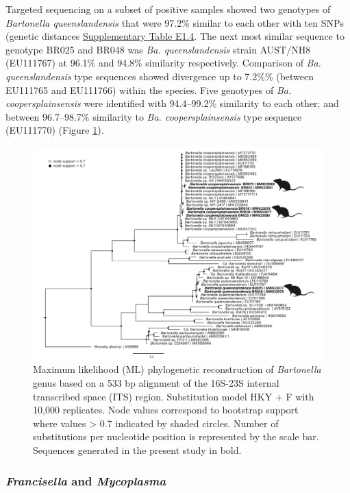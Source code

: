\documentclass[a4paper, nobind]{templates/ociamthesis}
\begin{document}
Targeted sequencing on a subset of positive samples showed two genotypes of \emph{Bartonella queenslandensis} that were 97.2\% similar to each other with ten SNPs (genetic distances \protect\hyperlink{supplementary-table-e1.4}{Supplementary Table E1.4}.
The next most similar sequence to genotype BR025 and BR048 was \emph{Ba. queenslandensis} strain AUST/NH8 (EU111767) at 96.1\% and 94.8\% similarity respectively.
Comparison of \emph{Ba. queenslandensis} type sequences showed divergence up to 7.2\%\% (between EU111765 and EU111766) within the species. Five genotypes of \emph{Ba. coopersplainsensis} were identified with 94.4--99.2\% similarity to each other; and between 96.7--98.7\% similarity to \emph{Ba. coopersplainsensis} type sequence (EU111770) (Figure \ref{fig:F3bartonella}).

\begin{figure}
\includegraphics[width=0.95\linewidth]{figures/ms-figs/Ch3-bartonellatree} \caption[Phylogeny of  \textit{Bartonella} species.]{Maximum likelihood (ML) phylogenetic reconstruction of \textit{Bartonella} genus based on a 533 bp alignment of the 16S-23S internal transcribed space (ITS) region. Substitution model HKY + F with 10,000 replicates. Node values correspond to bootstrap support where values > 0.7 indicated by shaded circles. Number of substitutions per nucleotide position is represented by the scale bar. Sequences generated in the present study in bold.}\label{fig:F3bartonella}
\end{figure}

\hypertarget{francisella-and-mycoplasma}{%
\subsubsection{\texorpdfstring{\emph{Francisella} and \emph{Mycoplasma}}{Francisella and Mycoplasma}}\label{francisella-and-mycoplasma}}
\end{document}
